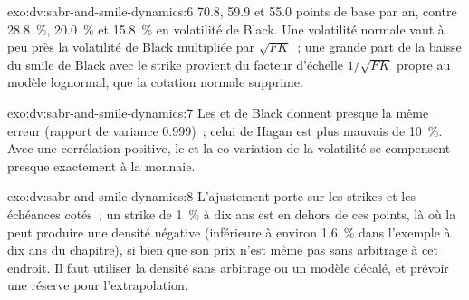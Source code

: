 \begin{solution}{exo:dv:sabr-and-smile-dynamics:6}
70.8, 59.9 et 55.0 points de base par an, contre 28.8~\%, 20.0~\% et 15.8~\% en volatilité de Black. Une volatilité normale vaut
à peu près la volatilité de Black multipliée par $\sqrt{FK}$~; une grande part de la baisse du smile de Black avec le strike
provient du facteur d'échelle $1/\sqrt{FK}$ propre au modèle lognormal, que la cotation normale supprime.
\end{solution}

\begin{solution}{exo:dv:sabr-and-smile-dynamics:7}
Les  et de Black donnent presque la même erreur (rapport de variance 0.999)~; celui de Hagan est
plus mauvais de 10~\%. Avec une corrélation positive, le  et la co-variation de la volatilité se compensent presque exactement à la monnaie.
\end{solution}

\begin{solution}{exo:dv:sabr-and-smile-dynamics:8}
L'ajustement porte sur les strikes et les échéances cotés~; un strike de 1~\% à dix ans est en dehors de ces points, là où la  peut produire une densité négative (inférieure à environ 1.6~\% dans l'exemple à dix ans du chapitre), si bien que son prix n'est même pas sans arbitrage à cet endroit.
Il faut utiliser la densité sans arbitrage ou un modèle décalé, et prévoir une réserve pour l'extrapolation.
\end{solution}

